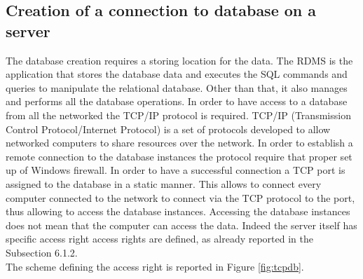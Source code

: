 \documentclass[../main.tex]{subfiles}
\begin{document}
\subsection{Creation of a connection to database on a server}
The database creation requires a storing location for the data. The \gls{RDMS} is the application that stores the database data and executes the SQL commands and queries to manipulate the relational database. Other than that, it also manages and performs all the database operations. In order to have access to a database from all the networked the \gls{TCP/IP} protocol is required. \gls{TCP/IP} (Transmission Control Protocol/Internet Protocol) is a set of protocols developed to allow networked computers to share resources over the network. In order to establish a remote connection to the database instances the protocol require that proper set up of Windows firewall. In order to have  a successful connection a TCP port is assigned to the database in a static manner. 
This allows to connect every computer connected to the network to connect via the TCP protocol to the port, thus allowing to access the database instances. Accessing the database instances does not mean that the computer can access the data. Indeed the server itself has specific access right access rights are defined, as already reported in the Subsection 6.1.2.\\
The scheme defining the access right is reported in Figure \ref{fig:tcpdb}.
\end{document}
